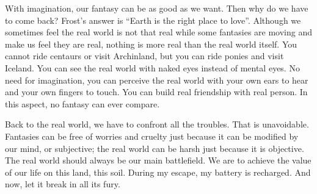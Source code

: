 \par With imagination, our fantasy can be as good as we want. Then why do we have to come back? Frost’s answer is ``Earth is the right place to love''. Although we sometimes feel the real world is not that real while some fantasies are moving and make us feel they are real, nothing is more real than the real world itself. You cannot ride centaurs or visit Archinland, but you can ride ponies and visit Iceland. You can see the real world with naked eyes instead of mental eyes. No need for imagination, you can perceive the real world with your own ears to hear and your own fingers to touch. You can build real friendship with real person. In this aspect, no fantasy can ever compare.
\par Back to the real world, we have to confront all the troubles. That is unavoidable. Fantasies can be free of worries and cruelty just because it can be modified by our mind, or subjective; the real world can be harsh just because it is objective. The real world should always be our main battlefield. We are to achieve the value of our life on this land, this soil. During my escape, my battery is recharged. And now, let it break in all its fury. 
\par {}